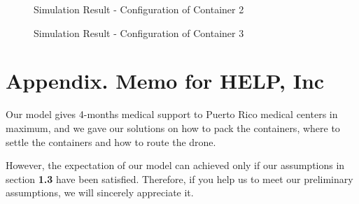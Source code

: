 \documentclass[12pt]{article}
\begin{document}
	
	\begin{figure}[H]
		\centering
		\caption{Simulation Result - Configuration of Container 2}
	\end{figure}
	
	
	\begin{figure}[H]
		\centering
		\caption{Simulation Result - Configuration of Container 3}
	\end{figure}
	
	\newpage
	\section{Appendix. Memo for HELP, Inc}
	Our model gives 4-months medical support to Puerto Rico medical centers in maximum, and we gave our solutions on how to pack the containers, where to settle the containers and how to route the drone. \par 
	However, the expectation of our model can achieved only if our assumptions in section \textbf{1.3} have been satisfied. Therefore, if you help us to meet our preliminary assumptions, we will sincerely appreciate it. \par 
	
	\newpage
\end{document}
